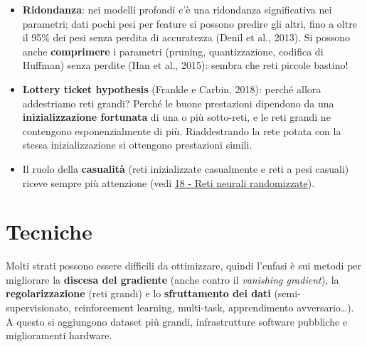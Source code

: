 \begin{itemize}
\tightlist
\item
  \textbf{Ridondanza}: nei modelli profondi c'è una ridondanza
  significativa nei parametri; dati pochi pesi per feature si possono
  predire gli altri, fino a oltre il 95\% dei pesi senza perdita di
  accuratezza (Denil et al., 2013). Si possono anche \textbf{comprimere}
  i parametri (pruning, quantizzazione, codifica di Huffman) senza
  perdite (Han et al., 2015): sembra che reti piccole bastino!
\item
  \textbf{Lottery ticket hypothesis} (Frankle e Carbin, 2018): perché
  allora addestriamo reti grandi? Perché le buone prestazioni dipendono
  da una \textbf{inizializzazione fortunata} di una o più sotto-reti, e
  le reti grandi ne contengono esponenzialmente di più. Riaddestrando la
  rete potata con la stessa inizializzazione si ottengono prestazioni
  simili.
\item
  Il ruolo della \textbf{casualità} (reti inizializzate casualmente e
  reti a pesi casuali) riceve sempre più attenzione (vedi
  \href{18\%20-\%20Reti\%20neurali\%20randomizzate}{18 - Reti neurali
  randomizzate}).
\end{itemize}

\section{Tecniche}\label{tecniche}

Molti strati possono essere difficili da ottimizzare, quindi l'enfasi è
sui metodi per migliorare la \textbf{discesa del gradiente} (anche
contro il \emph{vanishing gradient}), la \textbf{regolarizzazione} (reti
grandi) e lo \textbf{sfruttamento dei dati} (semi-supervisionato,
reinforcement learning, multi-task, apprendimento avversario\ldots). A
questo si aggiungono dataset più grandi, infrastrutture software
pubbliche e miglioramenti hardware.

